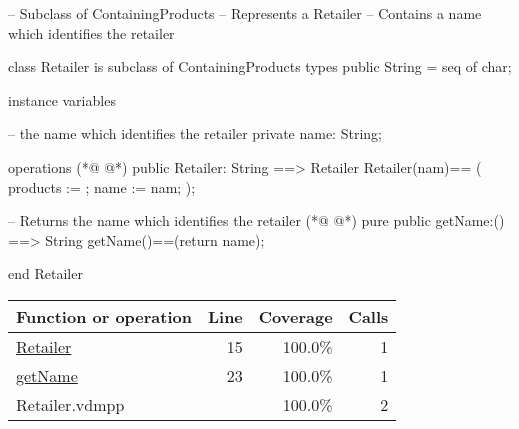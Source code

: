 \begin{vdmpp}[breaklines=true]
-- Subclass of ContainingProducts
-- Represents a Retailer
-- Contains a name which identifies the retailer

class Retailer is subclass of ContainingProducts
  types
    public String = seq of char;
        
    instance variables
    
        -- the name which identifies the retailer
        private name: String;
    
  operations 
(*@
\label{Retailer:15}
@*)
       public Retailer: String ==> Retailer
     Retailer(nam)==
     (
     products := {};
     name := nam;
     );
            
      -- Returns the name which identifies the retailer      
(*@
\label{getName:23}
@*)
      pure public getName:() ==> String
     getName()==(return name);

end Retailer
\end{vdmpp}
\bigskip
\begin{longtable}{|l|r|r|r|}
\hline
Function or operation & Line & Coverage & Calls \\
\hline
\hline
\hyperref[Retailer:15]{Retailer} & 15&100.0\% & 1 \\
\hline
\hyperref[getName:23]{getName} & 23&100.0\% & 1 \\
\hline
\hline
Retailer.vdmpp & & 100.0\% & 2 \\
\hline
\end{longtable}

